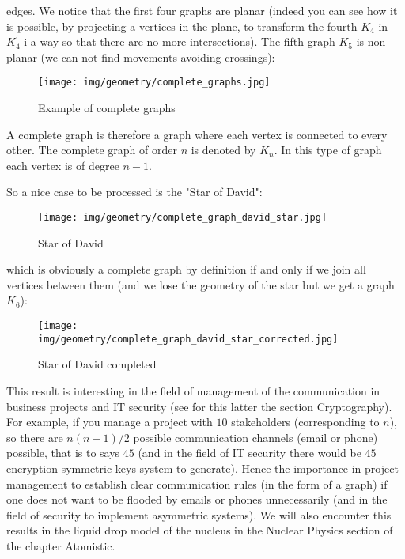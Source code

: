 {\begin{enumerate}
\begin{tcolorbox}[colframe=black,colback=white,sharp corners]
	edges. We notice that the first four graphs are planar (indeed you can see how it is possible, by projecting a vertices in the plane, to transform the fourth $K_4$ in $K_4^{\prime}$ i a way so that there are no more intersections). The fifth graph $K_5$ is non-planar (we can not find movements avoiding crossings):
	\begin{figure}[H]
		\centering
		\texttt{[image: img/geometry/complete\_graphs.jpg]}
		\caption{Example of complete graphs}
	\end{figure}
	A complete graph is therefore a graph where each vertex is connected to every other. The complete graph of order $n$ is denoted by $K_n$. In this type of graph each vertex is of degree $n-1$.
	\end{tcolorbox}
	
	\pagebreak
	\begin{tcolorbox}[colframe=black,colback=white,sharp corners]
	So a nice case to be processed is the "Star of David":
	\begin{figure}[H]
		\centering
		\texttt{[image: img/geometry/complete\_graph\_david\_star.jpg]}
		\caption{Star of David}
	\end{figure}
	which is obviously a complete graph by definition if and only if we join all vertices between them (and we lose the geometry of the star but we get a graph $K_6$):
	\begin{figure}[H]
		\centering
		\texttt{[image: img/geometry/complete\_graph\_david\_star\_corrected.jpg]}
		\caption{Star of David completed}
	\end{figure}
	\end{tcolorbox}
	\begin{tcolorbox}[title=Remark,colframe=black,arc=10pt]
	This result is interesting in the field of management of the communication in business projects and IT security (see for this latter the section Cryptography). For example, if you manage a project with $10$ stakeholders (corresponding to $n$), so there are $n(n-1) / 2$ possible communication channels (email or phone) possible, that is to says $45$ (and in the field of IT security there would be $45$ encryption symmetric keys system to generate). Hence the importance in project management to establish clear communication rules (in the form of a graph) if one does not want to be flooded by emails or phones unnecessarily (and in the field of security to implement asymmetric systems). We will also encounter this results in the liquid drop model of the nucleus in the Nuclear Physics section of the chapter Atomistic.
	\end{tcolorbox}
	

\end{enumerate}}
